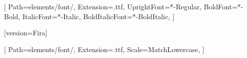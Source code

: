 
\setmainfont{Swis721BT}[
    Path=elements/font/,
    Extension=.ttf,
    UprightFont=*-Regular,
    BoldFont=*-Bold,
    ItalicFont=*-Italic,
    BoldItalicFont=*-BoldItalic,
]

[version=Fira]

\setmonofont{RedditMono}[
    Path=elements/font/,
    Extension=.ttf,
    Scale=MatchLowercase,
]